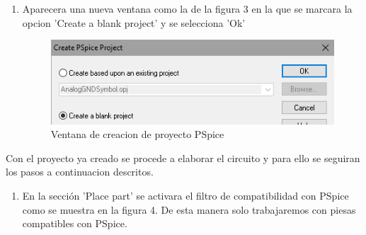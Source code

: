 \documentclass[letterpaper]{article}
\begin{document}
\begin{large}
\begin{enumerate}
\begin{figure}[htb]
                \label{fig:Menu New project}
            \end{figure}
            \item Aparecera una nueva ventana como la de la figura 3 en la que se marcara la opcion 'Create a blank project' y se selecciona 'Ok'\\
            \begin{figure}[htb]
                \centering
                \includegraphics[scale=0.6]{p3.png}
                \caption{Ventana de creacion de proyecto PSpice}
                \label{fig:Creacion PSpice}
            \end{figure}
        \end{enumerate}
        Con el proyecto ya creado se procede a elaborar el circuito y para ello se seguiran los pasos a continuacion descritos.
        \begin{enumerate}
            \item En la secci\'on 'Place part' se activara el filtro de compatibilidad con PSpice como se muestra en la figura 4. De esta manera solo trabajaremos con piesas compatibles con PSpice.\\
            \begin{figure}[htbp]
                \centering

\end{figure}
\end{enumerate}
\end{large}
\end{document}
